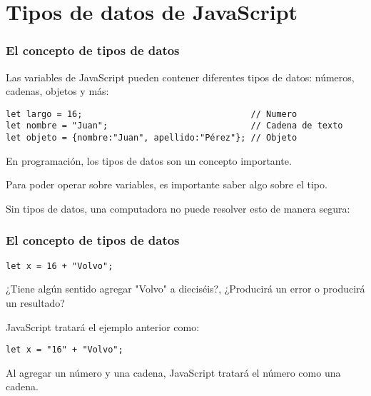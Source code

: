
\section{Tipos de datos de JavaScript}

\begin{frame}[fragile]
  \frametitle{El concepto de tipos de datos}

  Las variables de JavaScript pueden contener diferentes tipos de datos:
  números, cadenas, objetos y más:

  \vspace{\baselineskip}
  \begin{lstlisting}
let largo = 16;                                 // Numero
let nombre = "Juan";                            // Cadena de texto
let objeto = {nombre:"Juan", apellido:"Pérez"}; // Objeto 
  \end{lstlisting}

  En programación, los tipos de datos son un concepto importante.

  Para poder operar sobre variables, es importante saber algo sobre el tipo.

  Sin tipos de datos, una computadora no puede resolver esto de manera segura:

\end{frame}

\begin{frame}[fragile]
  \frametitle{El concepto de tipos de datos}

  \begin{lstlisting}
let x = 16 + "Volvo";
  \end{lstlisting}

  \vspace{\baselineskip}
  ¿Tiene algún sentido agregar "Volvo" a dieciséis?,
  ¿Producirá un error o producirá un resultado?

  JavaScript tratará el ejemplo anterior como:

  \vspace{\baselineskip}
  \begin{lstlisting}
let x = "16" + "Volvo";
  \end{lstlisting}

  \begin{block}{}
    Al agregar un número y una cadena, JavaScript tratará el
    número como una cadena.
  \end{block}
\end{frame}

